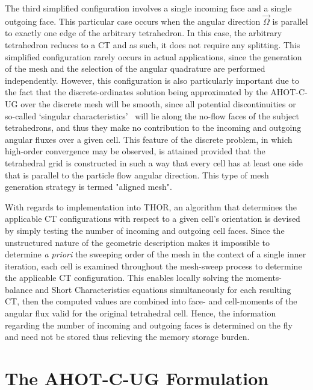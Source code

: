 The third simplified configuration involves a single incoming face and a single outgoing face. This particular case occurs when the angular direction $\vec{\Omega}$ is parallel to exactly one edge of the arbitrary tetrahedron. In this case, the arbitrary tetrahedron reduces to a CT and as such, it does not require any splitting. This simplified configuration rarely occurs in actual applications, since the generation of the mesh and the selection of the angular quadrature are performed independently. However, this configuration is also particularly important due to the fact that the discrete-ordinates solution being approximated by the AHOT-C-UG over the discrete mesh will be smooth, since all potential discontinuities or so-called ‘singular characteristics’~\cite{Duo2009} will lie along the no-flow faces of the subject tetrahedrons, and thus they make no contribution to the incoming and outgoing angular fluxes over a given cell. This feature of the discrete problem, in which high-order convergence may be observed, is attained provided that the tetrahedral grid is constructed in such a way that every cell has at least one side that is parallel to the particle flow angular direction. This type of mesh generation strategy is termed "aligned mesh".

With regards to implementation into THOR, an algorithm that determines the applicable CT configurations with respect to a given cell's orientation is devised by simply testing the number of incoming and outgoing cell faces. Since the unstructured nature of the geometric description makes it impossible to determine \textit{a priori} the sweeping order of the mesh in the context of a single inner iteration, each cell is examined throughout the mesh-sweep process to determine the applicable CT configuration. This enables locally solving the moments-balance and Short Characteristics equations simultaneously for each resulting CT, then the computed values are combined into face- and cell-moments of the angular flux valid for the original tetrahedral cell. Hence, the information regarding the number of incoming and outgoing faces is determined on the fly and need not be stored thus relieving the memory storage burden.

\section{The AHOT-C-UG Formulation}

